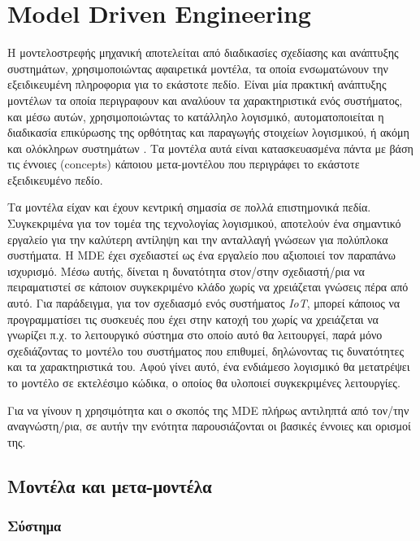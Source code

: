 \section{Model Driven Engineering}
\label{sec:theory_mde}

Η μοντελοστρεφής μηχανική αποτελείται από διαδικασίες σχεδίασης και ανάπτυξης συστημάτων, χρησιμοποιώντας αφαιρετικά μοντέλα, τα οποία ενσωματώνουν την εξειδικευμένη πληροφορια για το εκάστοτε πεδίο. Είναι μία πρακτική ανάπτυξης μοντέλων τα οποία περιγραφουν και αναλύουν τα χαρακτηριστικά ενός συστήματος, και μέσω αυτών, χρησιμοποιώντας το κατάλληλο λογισμικό, αυτοματοποιείται η διαδικασία επικύρωσης της ορθότητας και παραγωγής στοιχείων λογισμικού, ή ακόμη και ολόκληρων συστημάτων \cite{bib:brambilla_2012}. Τα μοντέλα αυτά είναι κατασκευασμένα πάντα με βάση τις έννοιες (concepts) κάποιου μετα-μοντέλου που περιγράφει το εκάστοτε εξειδικευμένο πεδίο.

Τα μοντέλα είχαν και έχουν κεντρική σημασία σε πολλά επιστημονικά πεδία. Συγκεκριμένα για τον τομέα της τεχνολογίας λογισμικού, αποτελούν ένα σημαντικό εργαλείο για την καλύτερη αντίληψη και την ανταλλαγή γνώσεων για πολύπλοκα συστήματα. Η MDE έχει σχεδιαστεί ως ένα εργαλείο που αξιοποιεί τον παραπάνω ισχυρισμό. Μέσω αυτής, δίνεται η δυνατότητα στον/στην σχεδιαστή/ρια να πειραματιστεί σε κάποιον συγκεκριμένο κλάδο χωρίς να χρειάζεται γνώσεις πέρα από αυτό. Για παράδειγμα, για τον σχεδιασμό ενός συστήματος \textit{IoT}, μπορεί κάποιος να προγραμματίσει τις συσκευές που έχει στην κατοχή του χωρίς να χρειάζεται να γνωρίζει π.χ. το λειτουργικό σύστημα στο οποίο αυτό θα λειτουργεί, παρά μόνο σχεδιάζοντας το μοντέλο του συστήματος που επιθυμεί, δηλώνοντας τις δυνατότητες και τα χαρακτηριστικά του. Αφού γίνει αυτό, ένα ενδιάμεσο λογισμικό θα μετατρέψει το μοντέλο σε εκτελέσιμο κώδικα, ο οποίος θα υλοποιεί συγκεκριμένες λειτουργίες.

Για να γίνουν η χρησιμότητα και ο σκοπός της MDE πλήρως αντιληπτά από τον/την αναγνώστη/ρια, σε αυτήν την ενότητα παρουσιάζονται οι βασικές έννοιες και ορισμοί της.

\subsection{Μοντέλα και μετα-μοντέλα}
\label{subsec:metamodels}

\subsubsection{Σύστημα}
\label{subsubsec:system}

